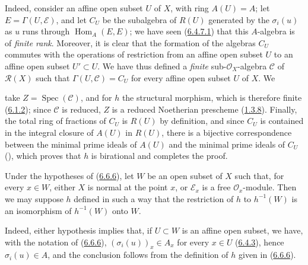Indeed, consider an affine open subset $U$ of $X$, with ring $A(U)=A$; let
$E=\Gamma(U,\mathcal{E})$, and let $C_U$ be the subalgebra of $R(U)$ generated
by the $\sigma_i(u)$ as $u$ runs through $\operatorname{Hom}_A(E,E)$; we
have seen (\hyperref[II.6.4.7.1]{6.4.7.1}) that this $A$-algebra is of
\emph{finite rank}. Moreover, it is clear that the formation of the algebras
$C_U$ commutes with the operations of restriction from an affine open subset
$U$ to an affine open subset $U'\subset U$. We have thus defined a
\emph{finite} sub-$\mathcal{O}_X$-algebra $\mathcal{C}$ of $\mathcal{R}(X)$
such that $\Gamma(U,\mathcal{C})=C_U$ for every affine open subset $U$ of
$X$. We


take $Z=\operatorname{Spec}(\mathcal{C})$, and for $h$ the structural
morphism, which is therefore finite (\hyperref[II.6.1.2]{6.1.2}); since
$\mathcal{C}$ is reduced, $Z$ is a reduced Noetherian prescheme
(\hyperref[II.1.3.8]{1.3.8}). Finally, the total ring of fractions of $C_U$
is $R(U)$ by definition, and since $C_U$ is contained in the integral
closure of $A(U)$ in $R(U)$, there is a bijective correspondence between the
minimal prime ideals of $A(U)$ and the minimal prime ideals of $C_U$
(\cite[t.~I, p.~259]{I-13}), which proves that $h$ is birational and
completes the proof.

\begin{corollary}[6.6.7]
\label{II.6.6.7}
Under the hypotheses of (\hyperref[II.6.6.6]{6.6.6}), let $W$ be an open
subset of $X$ such that, for every $x\in W$, either $X$ is normal at the
point $x$, or $\mathcal{E}_x$ is a free $\mathcal{O}_x$-module. Then we may
suppose $h$ defined in such a way that the restriction of $h$ to $h^{-1}(W)$
is an isomorphism of $h^{-1}(W)$ onto $W$.
\end{corollary}

Indeed, either hypothesis implies that, if $U\subset W$ is an affine open
subset, we have, with the notation of
(\hyperref[II.6.6.6]{6.6.6}), $(\sigma_i(u))_x\in A_x$ for every
$x\in U$ (\hyperref[II.6.4.3]{6.4.3}), hence $\sigma_i(u)\in A$, and the
conclusion follows from the definition of $h$ given in
(\hyperref[II.6.6.6]{6.6.6}).

